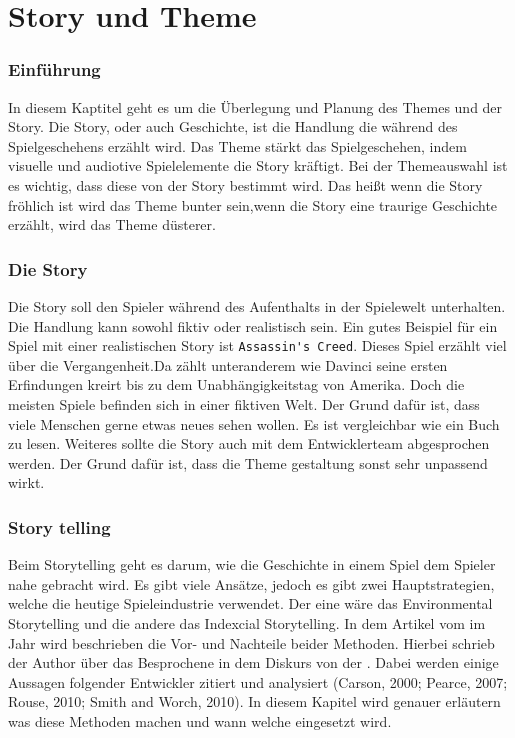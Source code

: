 \pagebreak
{}
\chapter {Story und Theme}

\subsection{Einführung}
In diesem Kaptitel geht es um die Überlegung und Planung des Themes und der Story. Die Story, oder auch Geschichte, ist die Handlung die während des Spielgeschehens erzählt wird. Das Theme stärkt das Spielgeschehen, indem visuelle und audiotive Spielelemente die Story kräftigt. Bei der Themeauswahl ist es wichtig, dass diese von der Story bestimmt wird. Das heißt wenn die Story fröhlich ist wird das Theme bunter sein,wenn die Story eine traurige Geschichte erzählt, wird das Theme düsterer. 

\subsection{Die Story}
Die Story soll den Spieler während des Aufenthalts in der Spielewelt unterhalten. Die Handlung kann sowohl fiktiv oder realistisch sein. Ein gutes Beispiel für ein Spiel mit einer realistischen Story ist \verb+Assassin's Creed+. Dieses Spiel erzählt viel über die Vergangenheit.Da zählt unteranderem  wie Davinci seine ersten Erfindungen kreirt bis zu dem Unabhängigkeitstag von Amerika. Doch die meisten Spiele befinden sich in einer fiktiven Welt. Der Grund dafür ist, dass viele Menschen gerne etwas neues sehen wollen. Es ist vergleichbar wie ein Buch zu lesen. Weiteres sollte die Story auch mit dem Entwicklerteam abgesprochen werden. Der Grund dafür ist, dass die Theme gestaltung sonst sehr unpassend wirkt. 



\subsection{Story telling}

Beim Storytelling geht es darum, wie die Geschichte in einem Spiel dem Spieler nahe gebracht wird. Es gibt viele Ansätze, jedoch es gibt zwei Hauptstrategien, welche die heutige Spieleindustrie verwendet. Der eine wäre das Environmental Storytelling und die andere das Indexcial Storytelling. In dem Artikel  vom \citeauthor{Fernadez1} im Jahr \citeyear{Fernadez1} wird beschrieben die Vor- und Nachteile beider Methoden. Hierbei schrieb der Author \citeauthor{Fernadez1} über das Besprochene in dem Diskurs von der . Dabei werden einige Aussagen folgender Entwickler zitiert und analysiert (Carson, 2000; Pearce, 2007; Rouse, 2010; Smith and Worch, 2010). In diesem Kapitel wird genauer erläutern was diese Methoden machen und wann welche eingesetzt wird. 

